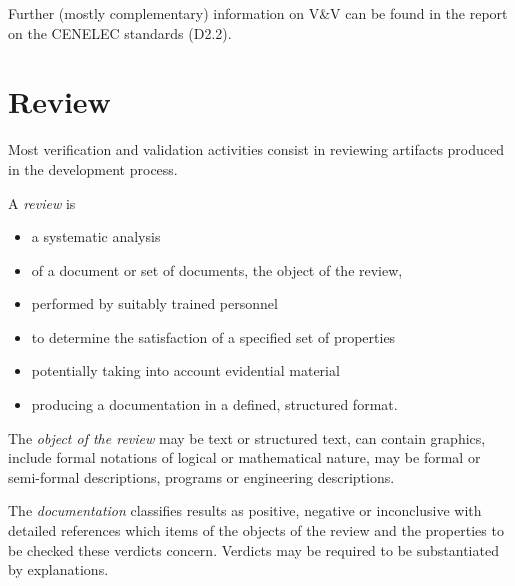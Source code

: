 \documentclass{template/openetcs_report}
\begin{document}
Further (mostly complementary) information on V\&V can be found in the
report on the CENELEC standards (D2.2).

\section{Review}
\label{sec:review}

Most verification and validation activities consist in reviewing
artifacts produced in the development process.

A \emph{review} is 
\begin{itemize}
\item a systematic analysis
\item of a document or set of documents, the object of the review,
\item performed by suitably trained personnel
\item to determine the satisfaction of a specified set of properties
\item potentially taking into account evidential material
\item producing a documentation in a defined, structured format.
\end{itemize}
%
The \emph{object of the review}  may be text or structured text, can
contain graphics, include formal notations of logical or mathematical
nature, may be formal or semi-formal descriptions, programs or
engineering descriptions.

The \emph{documentation} classifies results as positive, negative or
inconclusive with detailed references which items of the objects of
the review and the properties to be checked these verdicts
concern. Verdicts may be required to be substantiated by explanations. 



\end{document}
